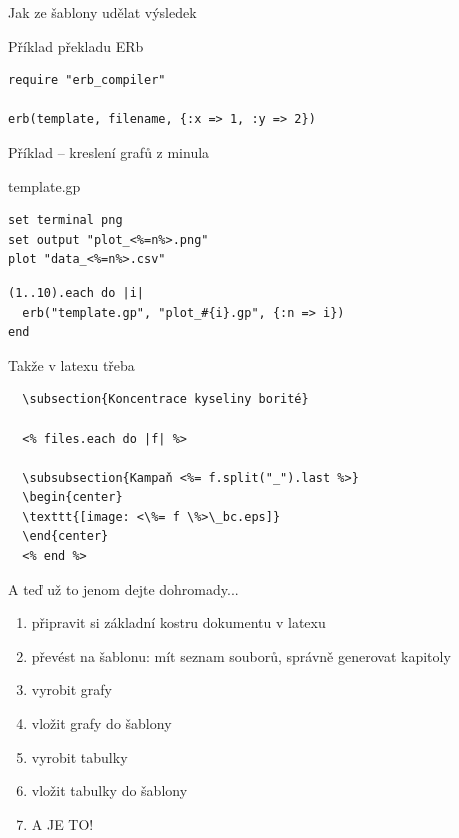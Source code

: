 \documentclass{beamer}
\begin{document}
\begin{frame}[fragile]{Jak ze šablony udělat výsledek}
  \scriptsize
  \begin{block}{Příklad překladu ERb}
    \scriptsize
    \begin{verbatim}
require "erb_compiler"

erb(template, filename, {:x => 1, :y => 2})
    \end{verbatim}
  \end{block}
\end{frame}

\begin{frame}[fragile]{Příklad -- kreslení grafů z minula}
  \begin{block}{template.gp}
    \scriptsize
    \begin{verbatim}
set terminal png
set output "plot_<%=n%>.png"
plot "data_<%=n%>.csv"
    \end{verbatim}
  \end{block}
  \begin{block}{}
    \scriptsize
    \begin{verbatim}
(1..10).each do |i|
  erb("template.gp", "plot_#{i}.gp", {:n => i})
end
    \end{verbatim}
  \end{block}
\end{frame}

\begin{frame}[fragile]{Takže v latexu třeba}
\scriptsize
\begin{verbatim}
  \subsection{Koncentrace kyseliny borité}

  <% files.each do |f| %>

  \subsubsection{Kampaň <%= f.split("_").last %>}
  \begin{center}
  \texttt{[image: <\%= f \%>\_bc.eps]}
  \end{center}
  <% end %>
\end{verbatim}
\end{frame}

\begin{frame}{A teď už to jenom dejte dohromady...}
  \begin{enumerate}
    \item připravit si základní kostru dokumentu v latexu
    \item převést na šablonu: mít seznam souborů, správně generovat kapitoly
    \item vyrobit grafy
    \item vložit grafy do šablony
    \item vyrobit tabulky
    \item vložit tabulky do šablony
    \item A JE TO!
  \end{enumerate}
\end{frame}
\end{document}
